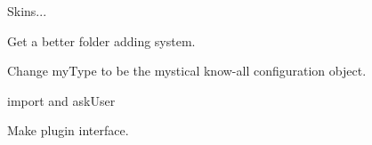 
\begin{DoxyRefList}
\item[\label{todo__todo000006}%
\hypertarget{todo__todo000006}{}%
Class \hyperlink{class_a_w_e_1_1_global_settings}{A\-W\-E\-:\-:Global\-Settings} ]Skins... 

Get a better folder adding system. 
\item[\label{todo__todo000002}%
\hypertarget{todo__todo000002}{}%
Class \hyperlink{class_a_w_e_1_1_j_s_o_n_scraper}{A\-W\-E\-:\-:J\-S\-O\-N\-Scraper} ]Change {\ttfamily my\-Type} to be the mystical know-\/all configuration object. 
\item[\label{todo__todo000003}%
\hypertarget{todo__todo000003}{}%
Member \hyperlink{class_a_w_e_1_1_j_s_o_n_scraper_afbed287c0fcae8d797552c711854b4e9}{A\-W\-E\-:\-:J\-S\-O\-N\-Scraper\-:\-:scrape\-Data\-For\-File} (Media\-File $\ast$file, bool ask\-User, bool import)]{\ttfamily import} and {\ttfamily ask\-User} 
\item[\label{todo__todo000001}%
\hypertarget{todo__todo000001}{}%
Class \hyperlink{class_a_w_e_1_1_media_player}{A\-W\-E\-:\-:Media\-Player} ]Make plugin interface. 
\end{DoxyRefList}